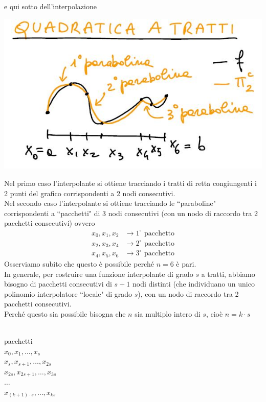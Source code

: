 e qui sotto dell'interpolazione\\
\begin{center}
    \includegraphics[scale=0.5]{foto/calcolo3}
\end{center}
Nel primo caso l'interpolante si ottiene tracciando i tratti di retta congiungenti i 2 punti del grafico corrispondenti a 2 nodi consecutivi.\\
Nel secondo caso l'interpolante si ottiene tracciando le ``paraboline" corrispondenti a ``pacchetti" di 3 nodi consecutivi (con un nodo di raccordo tra 2 pacchetti consecutivi) ovvero
\[\begin{split}
    x_0,x_1,x_2 & \rightarrow 1^\circ \text{ pacchetto}\\
    x_2,x_3,x_4 & \rightarrow 2^\circ \text{ pacchetto}\\
    x_4,x_5,x_6 & \rightarrow 3^\circ \text{ pacchetto}
\end{split}\]
Osserviamo subito che questo è possibile perché $n=6$ è pari.\\
In generale, per costruire una funzione interpolante di grado $s$ a tratti, abbiamo bisogno di pacchetti consecutivi di $s+1$ nodi distinti (che individuano un unico polinomio interpolatore ``locale" di grado $s$), con un nodo di raccordo tra 2 pacchetti consecutivi.\\
Perché questo sia possibile bisogna che $n$ sia multiplo intero di $s$, cioè $n = k \cdot s$\\\\
\begin{minipage}{0.33\textwidth}
\begin{center}
    pacchetti\\
    $x_0, x_1, \dotso, x_s$\\
    $x_s, x_{s+1}, \dotso, x_{2s}$\\
    $x_{2s}, x_{2s+1}, \dotso, x_{3s}$\\
    $\dotso$\\
    $x_{(k+1) \cdot s}, \dotso, x_{ks}$
\end{center}
\end{minipage}
